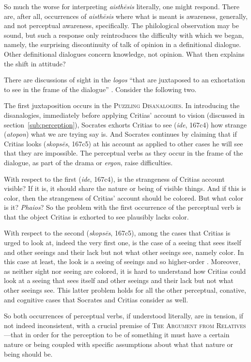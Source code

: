 So much the worse for interpreting \emph{aisthēsis} literally, one might respond. There are, after all, occurrences of \emph{aisthēsis} where what is meant is awareness, generally, and not perceptual awareness, specifically. The philological observation may be sound, but such a response only reintroduces the difficulty with which we began, namely, the surprising discontinuity of talk of opinion in a definitional dialogue. Other definitional dialogues concern knowledge, not opinion. What then explains the shift in attitude?

There are discussions of sight in the \emph{logos} ``that are juxtaposed to an exhortation to see in the frame of the dialogue'' \citep[9]{McCabe:2007ss}. Consider the following two.

The first juxtaposition occurs in the \textsc{Puzzling Disanalogies}. In introducing the disanalogies, immediately before applying Critias' account to vision (discussed in section~\ref{sub:perception}), Socrates exhorts Critias to see (\emph{ide}, 167c4) how strange (\emph{atopon}) what we are trying say is. And Socrates continues by claiming that if Critias looks (\emph{skopsēs}, 167c5) at his account as applied to other cases he will see that they are impossible. The perceptual verbs as they occur in the frame of the dialogue, as part of the drama or \emph{ergon}, raise difficulties. 

With respect to the first (\emph{ide}, 167c4), is the strangeness of Critias account visible? If it is, it should share the nature or being of visible things. And if this is color, then the strangeness of Critias' account should be colored. But what color is it? \emph{Phaios}? So the problem with the first occurrence of the perceptual verb is that the object Critias is exhorted to see plausibly lacks color.

With respect to the second (\emph{skopsēs}, 167c5), among the cases that Critias is urged to look at, indeed the very first one, is the case of a seeing that sees itself and other seeings and their lack but not what other seeings see, namely color. In this case at least, the look is a seeing of seeings and so higher-order \citep[9–10]{McCabe:2007ss}. Moreover, as neither sight nor seeing are colored, it is hard to understand how Critias could look at a seeing that sees itself and other seeings and their lack but not what other seeings see. This latter problem holds for all the other perceptual, conative, and cognitive cases that Socrates and Critias consider as well.

So both occurrences of perceptual verbs, if understood literally, are in tension, if not indeed inconsistent, with a crucial premise of \textsc{The Argument from Relatives}—that in order for the perception to be of something it must have a certain nature or being coupled with specific assumptions about what that nature or being should be.

